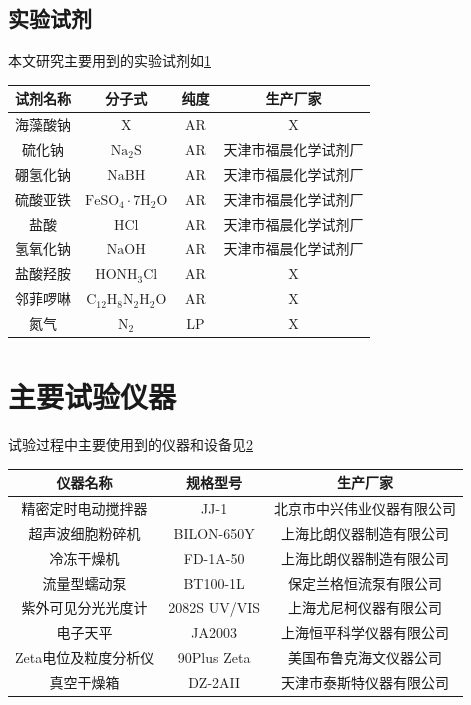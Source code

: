 

\subsection{实验试剂}

本文研究主要用到的实验试剂如\cref{tab1}

\begin{table}[h]
	\centering
	\label{tab1}
	\begin{tabular}{@{}cccc@{}}
        \toprule
		试剂名称&分子式&纯度&生产厂家\\
        \midrule
		海藻酸钠&X&AR&X\\
		硫化钠&$\mathrm{Na_2S}$&AR&天津市福晨化学试剂厂\\
		硼氢化钠&$\mathrm{NaBH}$&AR&天津市福晨化学试剂厂\\
		硫酸亚铁&$\mathrm{FeSO_4\cdot7H_2O}$&AR&天津市福晨化学试剂厂\\
		盐酸&$\mathrm{HCl}$&AR&天津市福晨化学试剂厂\\
        氢氧化钠&$\mathrm{NaOH}$&AR&天津市福晨化学试剂厂\\
        盐酸羟胺&$\mathrm{HONH_3Cl}$&AR&X\\
        邻菲啰啉&$\mathrm{C_12H_8N_2H_2O}$&AR&X\\
        氮气&$\mathrm{N_2}$&LP&X\\
        \bottomrule
	\end{tabular}
\end{table}

\section{主要试验仪器}

试验过程中主要使用到的仪器和设备见\cref{tab2}

\begin{table}[h]
	\centering
	\label{tab2}
	\begin{tabular}{@{}ccc@{}}\toprule
		仪器名称&规格型号&生产厂家\\\midrule
		精密定时电动搅拌器&JJ-1&北京市中兴伟业仪器有限公司\\
        超声波细胞粉碎机&BILON-650Y&上海比朗仪器制造有限公司\\
		冷冻干燥机&FD-1A-50&上海比朗仪器制造有限公司\\
		流量型蠕动泵&BT100-1L&保定兰格恒流泵有限公司\\
		紫外可见分光光度计&2082S UV/VIS&上海尤尼柯仪器有限公司\\
		电子天平&JA2003&上海恒平科学仪器有限公司\\
        Zeta电位及粒度分析仪&90Plus Zeta&美国布鲁克海文仪器公司\\
        真空干燥箱&DZ-2AII&天津市泰斯特仪器有限公司\\\bottomrule
	\end{tabular}
\end{table}

